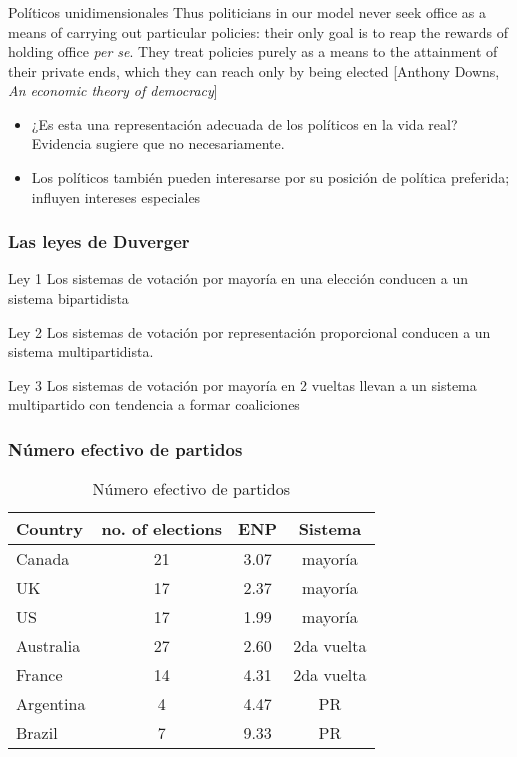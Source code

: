\documentclass[14pt,aspectratio=169]{beamer}
\begin{document}
\begin{frame}\frametitle{}
\begin{block}{Políticos unidimensionales}
Thus politicians in our model never seek office as a means of carrying
out particular policies: their only goal is to reap the rewards of
holding office \textit{per se}. They treat policies purely as a means
to the attainment of their private ends, which they can reach only by
being elected [Anthony Downs, \textit{An economic theory of democracy}]
\end{block}
\begin{itemize}\itemsep 10pt
\item ¿Es esta una representación adecuada de los políticos en la vida
  real? Evidencia sugiere que no necesariamente. 
\item Los políticos también pueden interesarse por su
  posición de política preferida; influyen intereses especiales
\end{itemize}
\end{frame}


\begin{frame}\frametitle{Las leyes de Duverger}
\begin{block}{Ley 1}
Los sistemas de votación por mayoría en una elección conducen a un sistema bipartidista
\end{block}
\begin{block}{Ley 2}
Los sistemas de votación por representación proporcional conducen a un
sistema multipartidista. 
\end{block}
\begin{block}{Ley 3}
Los sistemas de votación por mayoría en 2 vueltas llevan a un
sistema multipartido con tendencia a formar coaliciones
\end{block}
\end{frame}


\begin{frame}\frametitle{Número efectivo de partidos}
  \begin{table}[htbp]
    \centering
    \begin{tabular}[htbp]{lccc}
      Country	&	no. of elections	&	ENP & Sistema	\\ \hline
Canada	&	21	&	3.07  & mayoría	\\ \hline
UK	&	17	&	2.37  & mayoría	\\ \hline
US	&	17	&	1.99  & mayoría	\\ \hline
Australia	&	27	& 2.60 &  2da vuelta	\\ \hline
France	&	14	&	4.31 & 2da vuelta	\\ \hline
Argentina & 4 & 4.47 & PR \\\hline
Brazil &  7 & 9.33 & PR  \\ \hline
    \end{tabular}
    \caption{Número efectivo de partidos}
    \label{tab:2}
  \end{table}
\end{frame}
\end{document}
